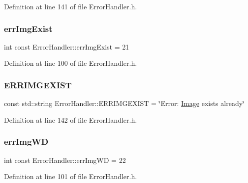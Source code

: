 Definition at line 141 of file Error\+Handler.\+h.

\mbox{\label{classErrorHandler_a53571f96a023b3af97618425aaf169a6}} 
\subsubsection{\texorpdfstring{errImgExist}{errImgExist}}
{\footnotesize\ttfamily int const Error\+Handler\+::err\+Img\+Exist = 21\hspace{0.3cm}{\ttfamily [static]}}



Definition at line 100 of file Error\+Handler.\+h.

\mbox{\label{classErrorHandler_a32d9d3b8749844fa07ce891edea63286}} 
\subsubsection{\texorpdfstring{ERRIMGEXIST}{ERRIMGEXIST}}
{\footnotesize\ttfamily const std\+::string Error\+Handler\+::\+E\+R\+R\+I\+M\+G\+E\+X\+I\+ST = \char`\"{}Error\+: \mbox{\hyperlink{classImage}{Image}} exists already\char`\"{}\hspace{0.3cm}{\ttfamily [static]}}



Definition at line 142 of file Error\+Handler.\+h.

\mbox{\label{classErrorHandler_afe6bbe690173284ff3f3adb889c036d8}} 
\subsubsection{\texorpdfstring{errImgWD}{errImgWD}}
{\footnotesize\ttfamily int const Error\+Handler\+::err\+Img\+WD = 22\hspace{0.3cm}{\ttfamily [static]}}



Definition at line 101 of file Error\+Handler.\+h.

\mbox{\label{classErrorHandler_adf275e9080935450d46748424c788efa}} 
